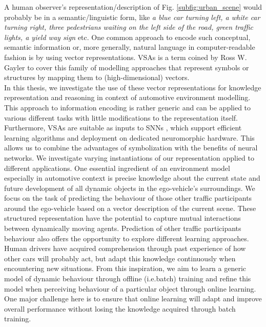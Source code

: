 A human observer's representation/description of Fig. \ref{subfig:urban_scene} would probably be in a semantic/linguistic form, like \emph{a blue car turning left, a white car turning right, three pedestrians waiting on the left side of the road, green traffic lights, a yield way sign} etc.
One common approach to encode such conceptual, semantic information or, more generally, natural language in computer-readable fashion is by using vector representations.
\acfp{VSA} is a term coined by Ross W. Gayler \cite{Gayler2003} to cover this family of modelling approaches that represent symbols or structures by mapping them to (high-dimensional) vectors.\\
In this thesis, we investigate the use of these vector representations for knowledge representation and reasoning in context of automotive environment modelling.
This approach to information encoding is rather generic and can be applied to various different tasks with little modifications to the representation itself.
Furthermore, \acp{VSA} are suitable as inputs to \acp{SNN} \cite{Eliasmith2013}, which support efficient learning algorithms and deployment on dedicated neuromorphic hardware.
This allows us to combine the advantages of symbolization with the benefits of neural networks.
We investigate varying instantiations of our representation applied to different applications. 
One essential ingredient of an environment model especially in automotive context is precise knowledge about the current state and future development of all dynamic objects in the ego-vehicle's surroundings.
We focus on the task of predicting the behaviour of those other traffic participants around the ego-vehicle based on a vector description of the current scene.
These structured representation have the potential to capture mutual interactions between dynamically moving agents.
Prediction of other traffic participants behaviour also offers the opportunity to explore different learning approaches.
Human drivers have acquired comprehension through past experience of how other cars will probably act, but adapt this knowledge continuously when encountering new situations.
From this inspiration, we aim to learn a generic model of dynamic behaviour through offline (i.e.batch) training and refine this model when perceiving behaviour of a particular object through online learning.
One major challenge here is to ensure that online learning will adapt and improve overall performance without losing the knowledge acquired through batch training.


